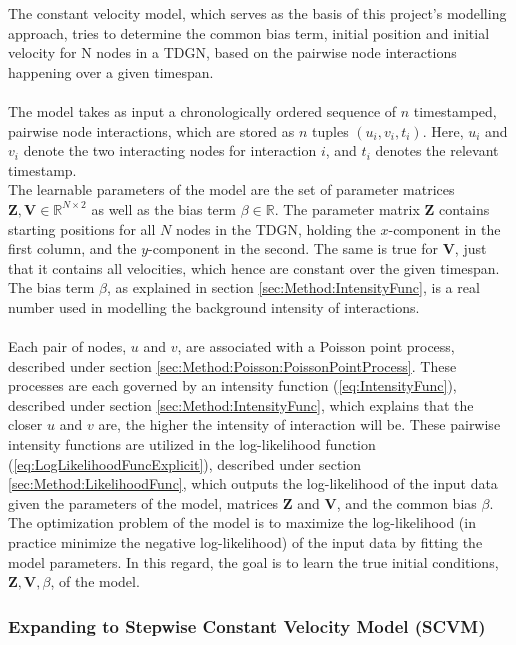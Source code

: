 The constant velocity model, which serves as the basis of this project's modelling approach, tries to determine the common bias term, initial position and initial velocity for N nodes in a TDGN, based on the pairwise node interactions happening over a given timespan.
\\\\
The model takes as input a chronologically ordered sequence of $n$ timestamped, pairwise node interactions, which are stored as $n$ tuples $(u_i, v_i, t_i)$.
Here, $u_i$ and $v_i$ denote the two interacting nodes for interaction $i$, and $t_i$ denotes the relevant timestamp.
\\
The learnable parameters of the model are the set of parameter matrices $\textbf{Z}, \textbf{V} \in \mathbb{R} ^{N \times 2}$ as well as the bias term $\beta \in \mathbb{R}$.
The parameter matrix $\textbf{Z}$ contains starting positions for all $N$ nodes in the TDGN, holding the $x$-component in the first column, and the $y$-component in the second.
The same is true for $\textbf{V}$, just that it contains all velocities, which hence are constant over the given timespan.
The bias term $\beta$, as explained in section \ref{sec:Method:IntensityFunc}, is a real number used in modelling the background intensity of interactions.
\\\\
Each pair of nodes, $u$ and $v$, are associated with a Poisson point process, described under section \ref{sec:Method:Poisson:PoissonPointProcess}.
These processes are each governed by an intensity function (\ref{eq:IntensityFunc}), described under section \ref{sec:Method:IntensityFunc}, which explains that the closer $u$ and $v$ are, the higher the intensity of interaction will be. 
These pairwise intensity functions are utilized in the log-likelihood function (\ref{eq:LogLikelihoodFuncExplicit}), described under section \ref{sec:Method:LikelihoodFunc}, which outputs the log-likelihood of the input data given the parameters of the model, matrices $\textbf{Z}$ and $\textbf{V}$, and the common bias $\beta$.
\\
The optimization problem of the model is to maximize the log-likelihood (in practice minimize the negative log-likelihood) of the input data by fitting the model parameters.
In this regard, the goal is to learn the true initial conditions, $\textbf{Z}, \textbf{V}, \beta$, of the model.


\subsubsection{Expanding to Stepwise Constant Velocity Model (SCVM)}
\label{sec:Method:ProposedModel:PiecewiseConstantVelocityModel}

